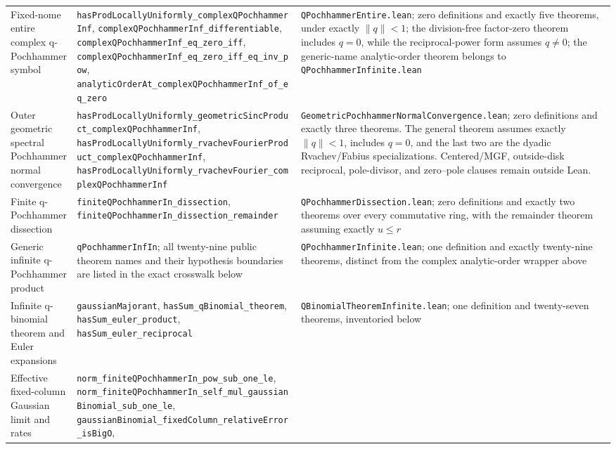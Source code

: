 \documentclass[11pt,oneside]{article}
\theoremstyle{definition}
\theoremstyle{remark}
\begin{document}
\begin{longtable}{@{}p{}p{}p{}@{}}
Fixed-nome entire complex q-Pochhammer symbol &
\nolinkurl{hasProdLocallyUniformly_complexQPochhammerInf},
\nolinkurl{complexQPochhammerInf_differentiable},
\nolinkurl{complexQPochhammerInf_eq_zero_iff},
\nolinkurl{complexQPochhammerInf_eq_zero_iff_eq_inv_pow},
\nolinkurl{analyticOrderAt_complexQPochhammerInf_of_eq_zero} &
\nolinkurl{QPochhammerEntire.lean}; zero definitions and exactly five theorems,
under exactly \(\lVert q\rVert<1\); the division-free factor-zero theorem
includes \(q=0\), while the reciprocal-power form assumes \(q\ne0\); the
generic-name analytic-order theorem belongs to \nolinkurl{QPochhammerInfinite.lean} \\
Outer geometric spectral Pochhammer normal convergence &
\nolinkurl{hasProdLocallyUniformly_geometricSincProduct_complexQPochhammerInf},
\nolinkurl{hasProdLocallyUniformly_rvachevFourierProduct_complexQPochhammerInf},
\nolinkurl{hasProdLocallyUniformly_rvachevFourier_complexQPochhammerInf} &
\nolinkurl{GeometricPochhammerNormalConvergence.lean}; zero definitions and
exactly three theorems.  The general theorem assumes exactly
\(\lVert q\rVert<1\), includes \(q=0\), and the last two are the dyadic
Rvachev/Fabius specializations.  Centered/MGF, outside-disk reciprocal,
pole-divisor, and zero--pole clauses remain outside Lean. \\
Finite q-Pochhammer dissection &
\nolinkurl{finiteQPochhammerIn_dissection},
\nolinkurl{finiteQPochhammerIn_dissection_remainder} &
\nolinkurl{QPochhammerDissection.lean}; zero definitions and exactly two
theorems over every commutative ring, with the remainder theorem assuming
exactly \(u\le r\) \\
Generic infinite q-Pochhammer product &
\nolinkurl{qPochhammerInfIn}; all twenty-nine public theorem names and their
hypothesis boundaries are listed in the exact crosswalk below &
\nolinkurl{QPochhammerInfinite.lean}; one definition and exactly twenty-nine
theorems, distinct from the complex analytic-order wrapper above \\
Infinite q-binomial theorem and Euler expansions &
\nolinkurl{gaussianMajorant}, \nolinkurl{hasSum_qBinomial_theorem},
\nolinkurl{hasSum_euler_product}, \nolinkurl{hasSum_euler_reciprocal} &
\nolinkurl{QBinomialTheoremInfinite.lean}; one definition and twenty-seven
theorems, inventoried below \\
Effective fixed-column Gaussian limit and rates &
\nolinkurl{norm_finiteQPochhammerIn_pow_sub_one_le},
\nolinkurl{norm_finiteQPochhammerIn_self_mul_gaussianBinomial_sub_one_le},
\nolinkurl{gaussianBinomial_fixedColumn_relativeError_isBigO},

\end{longtable}
\end{document}
